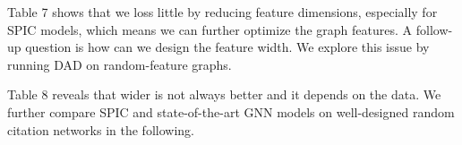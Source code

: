 \documentclass[preprint,11pt]{elsarticle}
\begin{document}
\begin{table}
\setlength{\abovecaptionskip}{0pt}
\setlength{\belowcaptionskip}{6pt}
  \caption{Test accuracy (\%) on reduced Cora}
  \label{table-7}
  \centering
\end{table}
Table 7 shows that we loss little by reducing feature dimensions, especially for SPIC models, which means we can further optimize the graph features. A follow-up question is how can we design the feature width. We explore this issue by running DAD on random-feature graphs. 
\begin{table}
\setlength{\abovecaptionskip}{0pt}
\setlength{\belowcaptionskip}{6pt}
  \caption{Test accuracy (\%) of DAD on random citation networks}
  \label{table-8}
  \centering
\end{table}
Table 8 reveals that wider is not always better and it depends on the data. We further compare SPIC and state-of-the-art GNN models on well-designed random citation networks in the following. 
\end{document}
